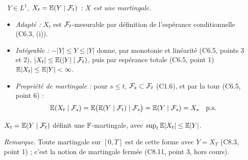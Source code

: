 \documentclass[11pt,a4paper]{article}
\newcommand{\question}[2]{\par\medskip\noindent\textbf{#1}~\textit{#2}\par\smallskip}
\begin{document}
\begin{exo}
\question{}{$Y\in L^1$, $X_t=\mathbb{E}(Y\mid\mathcal{F}_t)$ : $X$ est une martingale.}
\begin{itemize}
  \item \emph{Adapté :} $X_t$ est $\mathcal{F}_t$-mesurable par définition de l'espérance conditionnelle (C6.3, (i)).
  \item \emph{Intégrable :} $-|Y|\le Y\le|Y|$ donne, par monotonie et linéarité (C6.5, points 3 et 2), $|X_t|\le\mathbb{E}(|Y|\mid\mathcal{F}_t)$, puis par
  espérance totale (C6.5, point 1) $\mathbb{E}|X_t|\le\mathbb{E}|Y|<\infty$.
  \item \emph{Propriété de martingale :} pour $s\le t$, $\mathcal{F}_s\subset\mathcal{F}_t$ (C1.6), et par la tour (C6.5, point 6) :
  \[\mathbb{E}(X_t\mid\mathcal{F}_s)=\mathbb{E}\bigl(\mathbb{E}(Y\mid\mathcal{F}_t)\mid\mathcal{F}_s\bigr)=\mathbb{E}(Y\mid\mathcal{F}_s)=X_s\quad\text{p.s.}\]
\end{itemize}
\begin{resultat}$X_t=\mathbb{E}(Y\mid\mathcal{F}_t)$ définit une $\mathbb{F}$-martingale, avec $\sup_t\mathbb{E}|X_t|\le\mathbb{E}|Y|$.\end{resultat}
\textit{Remarque.} Toute martingale sur $[0,T]$ est de cette forme avec $Y=X_T$ (C8.3, point 1) ; c'est la notion de martingale fermée
(C8.11, point 3, hors cours).
\end{exo}
\end{document}
